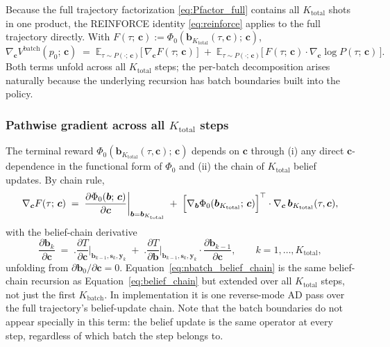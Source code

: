\documentclass[11pt,a4paper]{article}
\newcommand{\bc}{\bm{c}}
\newcommand{\by}{\bm{y}}
\newcommand{\bs}{\bm{s}}
\newcommand{\bb}{\bm{b}}
\newcommand{\E}{\mathbb{E}}
\begin{document}
Because the full trajectory factorization \eqref{eq:Pfactor_full} contains all $K_\mathrm{total}$
shots in one product, the REINFORCE identity \eqref{eq:reinforce} applies to the full
trajectory directly.  With $F(\tau;\, \bc) := \Phi_0(\bb_{K_\mathrm{total}}(\tau, \bc);\, \bc)$,
\begin{equation}
\nabla_{\bc} V^\mathrm{batch}(p_0;\, \bc)
\;=\;
\E_{\tau \sim P(\cdot;\, \bc)}\!\bigl[\,\nabla_{\bc} F(\tau;\, \bc)\,\bigr]
\;+\;
\E_{\tau \sim P(\cdot;\, \bc)}\!\bigl[\,F(\tau;\, \bc) \cdot \nabla_{\bc} \log P(\tau;\, \bc)\,\bigr].
\label{eq:nbatch_reinforce}
\end{equation}
Both terms unfold across all $K_\mathrm{total}$ steps; the per-batch decomposition arises
naturally because the underlying recursion has batch boundaries built into the policy.

\subsubsection{Pathwise gradient across all \texorpdfstring{$K_\mathrm{total}$}{K\_total} steps}
\label{sec:nbatch_pathwise}

The terminal reward $\Phi_0(\bb_{K_\mathrm{total}}(\tau, \bc);\, \bc)$ depends on $\bc$
through (i) any direct $\bc$-dependence in the functional form of $\Phi_0$ and (ii) the
chain of $K_\mathrm{total}$ belief updates.  By chain rule,
\begin{equation}
\nabla_{\bc} F(\tau;\, \bc)
\;=\;
\biggl.\frac{\partial \Phi_0(\bb;\, \bc)}{\partial \bc}\biggr|_{\bb = \bb_{K_\mathrm{total}}}
\;+\;
\Bigl[\nabla_{\bb} \Phi_0(\bb_{K_\mathrm{total}};\, \bc)\Bigr]^\top \cdot \nabla_{\bc}\, \bb_{K_\mathrm{total}}(\tau, \bc),
\label{eq:nbatch_pathwise}
\end{equation}
with the belief-chain derivative
\begin{equation}
\frac{\partial \bb_k}{\partial \bc}
\;=\;
\biggl.\frac{\partial T}{\partial \bc}\biggr|_{\bb_{k-1}, \bs_k, \by_k}
\;+\;
\biggl.\frac{\partial T}{\partial \bb}\biggr|_{\bb_{k-1}, \bs_k, \by_k}
\cdot
\frac{\partial \bb_{k-1}}{\partial \bc},
\qquad k = 1, \ldots, K_\mathrm{total},
\label{eq:nbatch_belief_chain}
\end{equation}
unfolding from $\partial \bb_0 / \partial \bc = 0$.  Equation~\eqref{eq:nbatch_belief_chain}
is the same belief-chain recursion as Equation~\eqref{eq:belief_chain} but extended over all
$K_\mathrm{total}$ steps, not just the first $K_\mathrm{batch}$.  In implementation it is
one reverse-mode AD pass over the full trajectory's belief-update chain.  Note that
the batch boundaries do not appear specially in this term: the belief update is the same
operator at every step, regardless of which batch the step belongs to.
\end{document}
